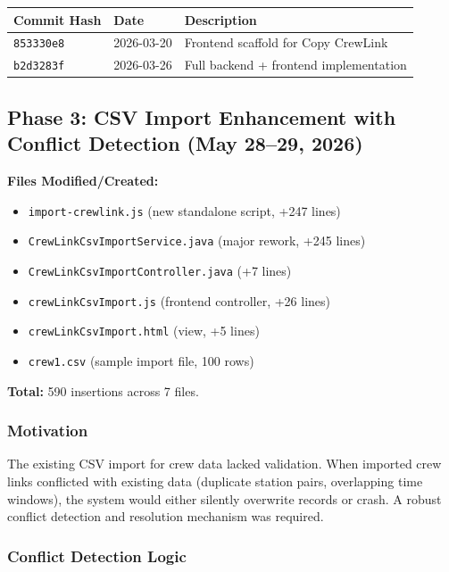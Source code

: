 \documentclass[12pt,a4paper]{article}
\begin{document}
\medskip
\begin{tabular}{@{} L{2.6cm} L{2.6cm} L{8cm} @{}}
\toprule
\textbf{Commit Hash} & \textbf{Date} & \textbf{Description} \\
\midrule
\texttt{853330e8} & 2026-03-20 & Frontend scaffold for Copy CrewLink \\
\texttt{b2d3283f} & 2026-03-26 & Full backend + frontend implementation \\
\bottomrule
\end{tabular}


\subsection{Phase 3: CSV Import Enhancement with Conflict Detection (May 28--29, 2026)}

\textbf{Files Modified/Created:}
\begin{itemize}[leftmargin=1.5em]
    \item \texttt{import-crewlink.js} (new standalone script, +247 lines)
    \item \texttt{CrewLinkCsvImportService.java} (major rework, +245 lines)
    \item \texttt{CrewLinkCsvImportController.java} (+7 lines)
    \item \texttt{crewLinkCsvImport.js} (frontend controller, +26 lines)
    \item \texttt{crewLinkCsvImport.html} (view, +5 lines)
    \item \texttt{crew1.csv} (sample import file, 100 rows)
\end{itemize}
\textbf{Total:} 590 insertions across 7 files.

\subsubsection{Motivation}

The existing CSV import for crew data lacked validation. When imported crew
links conflicted with existing data (duplicate station pairs, overlapping time
windows), the system would either silently overwrite records or crash. A robust
conflict detection and resolution mechanism was required.

\subsubsection{Conflict Detection Logic}
\end{document}
